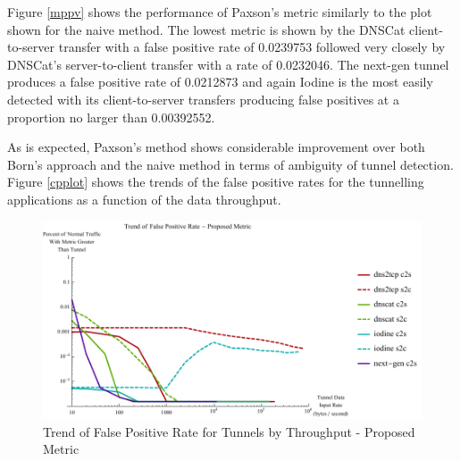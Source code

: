 \documentclass[12pt]{report}
\theoremstyle{remark}
\theoremstyle{definition}
\theoremstyle{definition}
\theoremstyle{definition}
\begin{document}
Figure \ref{mppv} shows the performance of Paxson's metric similarly to the plot
shown for the naive method. The lowest metric is shown by the DNSCat
client-to-server transfer with a false positive rate of 0.0239753 followed very closely by
DNSCat's server-to-client transfer with a rate of 0.0232046. The next-gen tunnel
produces a false positive rate of 0.0212873 and again Iodine is the most easily
detected with its client-to-server transfers producing false positives at a
proportion no larger than 0.00392552.

As is expected, Paxson's method shows considerable improvement over both
Born's approach and the naive method in terms of ambiguity of tunnel detection.
Figure \ref{cpplot} shows the trends of the false positive rates for the
tunnelling applications as a function of the data throughput.

\begin{figure}
\centering
\includegraphics[width=\textwidth]{figures/chplot.pdf}
\caption[Trend of False Positive Rate for Tunnels by Throughput - Proposed Metric]{Trend
 of False Positive Rate for Tunnels by Throughput - Proposed Metric}
\label{chplot}
\end{figure}
\end{document}
